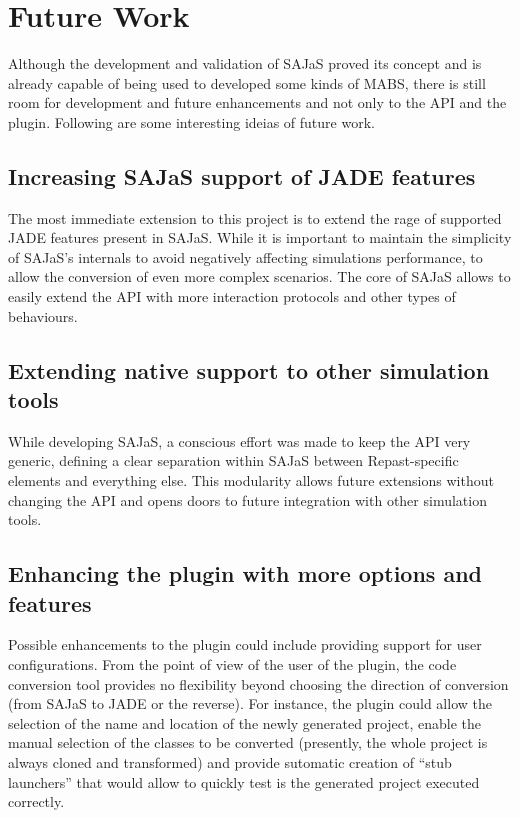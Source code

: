 \section{Future Work}
Although the development and validation of SAJaS proved its concept and is already capable of being used to developed some kinds of MABS, there is still room for development and future enhancements and not only to the API and the plugin. Following are some interesting ideias of future work.

\subsection{Increasing SAJaS support of JADE features}
The most immediate extension to this project is to extend the rage of supported JADE features present in SAJaS. While it is important to maintain the simplicity of SAJaS's internals to avoid negatively affecting simulations performance, to allow the conversion of even more complex scenarios. The core of SAJaS allows to easily extend the API with more interaction protocols and other types of behaviours.

\subsection{Extending native support to other simulation tools}
While developing SAJaS, a conscious effort was made to keep the API very generic, defining a clear separation within SAJaS between Repast-specific elements and everything else. This modularity allows future extensions without changing the API and opens doors to future integration with other simulation tools.

\subsection{Enhancing the plugin with more options and features}
Possible enhancements to the plugin could include providing support for user configurations. From the point of view of the user of the plugin, the code conversion tool provides no flexibility beyond choosing the direction of conversion (from SAJaS to JADE or the reverse). For instance, the plugin could allow the selection of the name and location of the newly generated project, enable the manual selection of the classes to be converted (presently, the whole project is always cloned and transformed) and provide sutomatic creation of ``stub launchers'' that would allow to quickly test is the generated project executed correctly.

